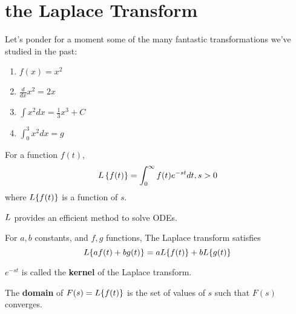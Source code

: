 \chapter{the Laplace Transform}


\begin{example}[transformations]
    Let's ponder for a moment some of the many fantastic transformations we've studied in the past:
    \begin{enumerate}
        \item $f(x) = x^2$
        \item $\frac{d}{dx}x^2 = 2x$
        \item $\int x^2 dx = \frac{1}{3}x^3 + C$
        \item $\int_{0}^{3} x^2 dx = g$
    \end{enumerate}
\end{example}

\begin{definition}
    For a function $f(t)$, $$L\left\{f(t)\right\} = \int_0^\infty f(t) e^{-st} dt, s>0$$
    where $L\{f(t)\}$ is a function of $s$.
\end{definition}

\begin{remark}
    $L$ provides an efficient method to solve ODEs.
\end{remark}

\begin{theorem}
    For $a,b$ constants, and $f, g$ functions, The Laplace transform satisfies
    $$L\{af(t) + bg(t)\} = aL\{f(t)\} + bL\{g(t)\}$$
\end{theorem}

\begin{definition}
    $e^{-st}$ is called the \textbf{kernel} of the Laplace transform.
\end{definition}

\begin{definition}
    The \textbf{domain} of $F(s) = L\{f(t)\}$ is the set of values of $s$ such that $F(s)$ converges.
\end{definition}

